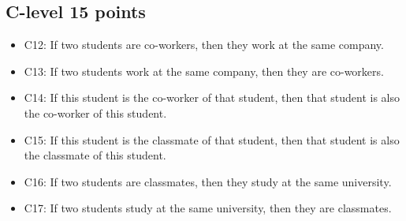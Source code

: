 \documentclass[11pt,a4paper]{article}
\begin{document}
\subsection{C-level 15 points}
\begin{itemize}
	\item C12: If two students are co-workers, then they work at the same company.
	\item C13: If two students work at the same company, then they are co-workers.
	\item C14: If this student is the co-worker of that student, then that student is also the co-worker of this student.
	\item C15: If this student is the classmate of that student, then that student is also the classmate of this student.
	\item C16: If two students are classmates, then they study at the same university.
	\item C17: If two students study at the same university, then they are classmates.
\end{itemize}
\end{document}
